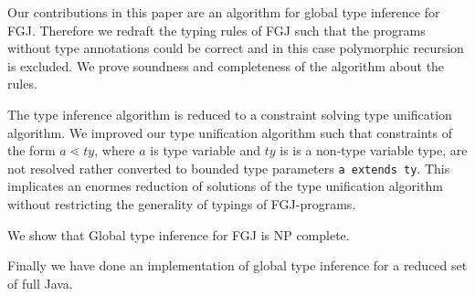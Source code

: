 
Our contributions in this paper are an algorithm for global type inference for
FGJ. Therefore we redraft the typing rules of FGJ such that the programs without
type annotations could be correct and in this case polymorphic recursion is
excluded. We prove soundness and completeness of the algorithm about the rules.

The type inference algorithm is reduced to a constraint solving type unification
algorithm. We improved our type unification algorithm such that constraints
of the form $a \lessdot ty$, where $a$ is type variable and $ty$ is is a
non-type variable type,
are not resolved rather converted to bounded type parameters \texttt{a extends
  ty}. This implicates an enormes reduction of solutions of the type
unification algorithm without restricting the generality of typings of
FGJ-programs.

We show that Global type inference for FGJ is NP complete.

Finally we have done an implementation of  global type inference for  a reduced
set of full Java.
\fi

